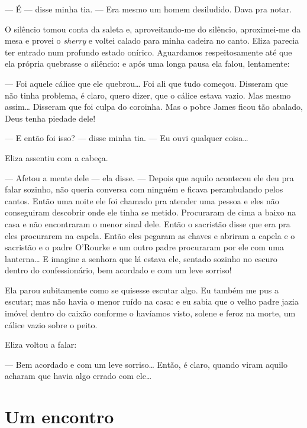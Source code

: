 --- É --- disse minha tia.  --- Era mesmo um homem desiludido.  Dava pra
notar.

O silêncio tomou conta da saleta e, aproveitando-me do silêncio, aproximei-me
da mesa e provei o \textit{sherry} e voltei calado para minha cadeira no canto.
Eliza parecia ter entrado num profundo estado onírico.  Aguardamos
respeitosamente até que ela própria quebrasse o silêncio: e após uma longa
pausa ela falou, lentamente:

--- Foi aquele cálice que ele quebrou\ldots{} Foi ali que tudo começou.
Disseram que não tinha problema, é claro, quero dizer, que o cálice estava
vazio.  Mas mesmo assim\ldots{} Disseram que foi culpa do coroinha.  Mas o
pobre James ficou tão abalado, Deus tenha piedade dele!

--- E então foi isso? --- disse minha tia.  --- Eu ouvi qualquer
coisa\ldots{}

Eliza assentiu com a cabeça.

--- Afetou a mente dele --- ela disse.  --- Depois que aquilo aconteceu ele
deu pra falar sozinho, não queria conversa com ninguém e ficava perambulando
pelos cantos.  Então uma noite ele foi chamado pra atender uma pessoa e eles
não conseguiram descobrir onde ele tinha se metido.  Procuraram de cima a baixo
na casa e não encontraram o menor sinal dele.  Então o sacristão disse que era
pra eles procurarem na capela.  Então eles pegaram as chaves e abriram a capela
e o sacristão e o padre O’Rourke e um outro padre procuraram por ele com uma
lanterna\ldots{} E imagine a senhora que lá estava ele, sentado sozinho no
escuro dentro do confessionário, bem acordado e com um leve sorriso!

Ela parou subitamente como se quisesse escutar algo.  Eu também me pus a
escutar; mas não havia o menor ruído na casa: e eu sabia que o velho padre
jazia imóvel dentro do caixão conforme o havíamos visto, solene e feroz na
morte, um cálice vazio sobre o peito.

Eliza voltou a falar:

--- Bem acordado e com um leve sorriso\ldots{} Então, é claro, quando viram
aquilo acharam que havia algo errado com ele\ldots{}


\chapter{Um encontro}

